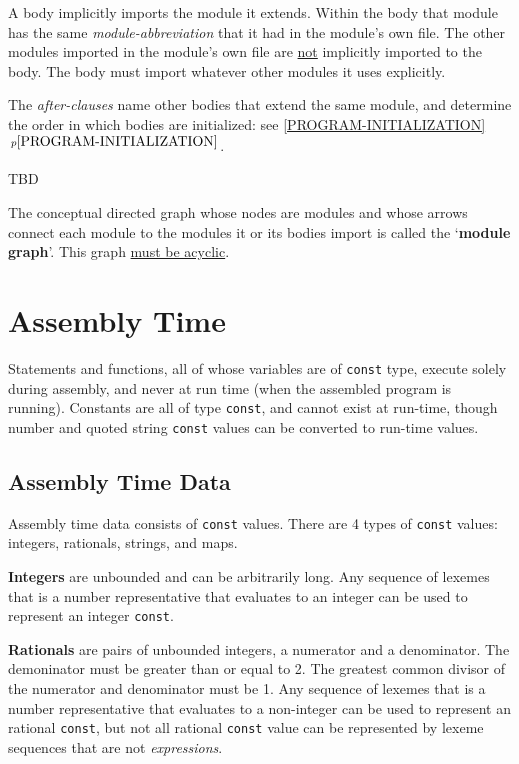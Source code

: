 \documentclass[12pt]{article}
\newcommand{\key}[1]{{\rm \bfseries #1}}
\newcommand{\itemref}[1]{\ref{#1}$\,^{p\pageref{#1}}$}
\begin{document}
A body implicitly imports the module it extends.  Within the
body that module has the same {\em module-abbreviation} that it
had in the module's own file.  The other modules imported in the
module's own file are \underline{not} implicitly imported
to the body.  The body must import whatever other modules it uses
explicitly.

The {\em after-clauses} name other bodies that extend the same
module, and determine the order in which bodies are initialized:
see \itemref{PROGRAM-INITIALIZATION}.

TBD

The conceptual directed graph whose nodes are modules and whose
arrows connect each module to the modules it or its bodies import is called
the `\key{module graph}'.\label{MODULE-GRAPH}
This graph \underline{must be acyclic}.

\section{Assembly Time}

Statements and functions, all of whose variables are of {\tt const}
type, execute solely during assembly, and never at run time
(when the assembled program is running).  Constants are all of
type {\tt const}, and cannot exist at run-time, though number
and quoted string {\tt const} values can be converted to run-time values.

\subsection{Assembly Time Data}

Assembly time data consists of {\tt const} values.
There are 4 types of {\tt const} values: integers, rationals, strings,
and maps.

\key{Integers} are unbounded and can be arbitrarily long.
Any sequence of lexemes that is a
number representative
that evaluates to an integer
can be used to represent an integer {\tt const}.

\key{Rationals} are pairs of unbounded integers, a numerator and a denominator.
The demoninator must be greater than or equal to 2.  The greatest common divisor
of the numerator and denominator must be 1.
Any sequence of lexemes that is a
number representative
that evaluates to a non-integer
can be used to represent an rational {\tt const}, but not all
rational {\tt const} value can be represented by lexeme sequences
that are not {\em expressions}.
\end{document}
